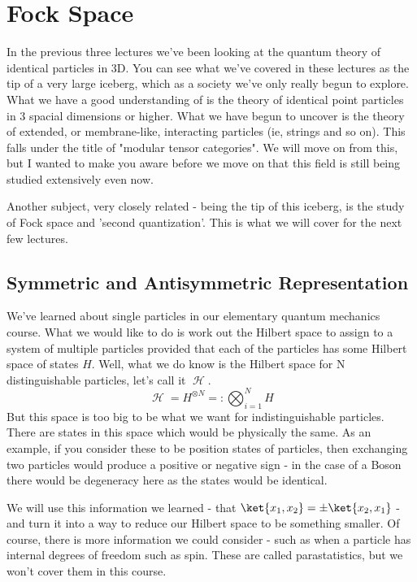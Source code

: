 \documentclass{article}
\DeclareMathOperator{\Hh}{{\mathcal{H}}}
\begin{document}
\section{Fock Space}
In the previous three lectures we've been looking at the quantum theory of identical particles in 3D. You can see what we've covered in these lectures as the tip of a very large iceberg, which as a society we've only really begun to explore. What we have a good understanding of is the theory of identical point particles in 3 spacial dimensions or higher. What we have begun to uncover is the theory of extended, or membrane-like, interacting particles (ie, strings and so on). This falls under the title of "modular tensor categories". We will move on from this, but I wanted to make you aware before we move on that this field is still being studied extensively even now.

Another subject, very closely related - being the tip of this iceberg, is the study of Fock space and 'second quantization'. This is what we will cover for the next few lectures.

\subsection{Symmetric and Antisymmetric Representation}

We've learned about single particles in our elementary quantum mechanics course. What we would like to do is work out the Hilbert space to assign to a system of multiple particles provided that each of the particles has some Hilbert space of states $H$. Well, what we do know is the Hilbert space for N distinguishable particles, let's call it $\Hh$.
\begin{equation}
\Hh = H^{\otimes N} =: \bigotimes_{i=1}^N H
\end{equation}
But this space is too big to be what we want for indistinguishable particles. There are states in this space which would be physically the same. As an example, if you consider these to be position states of particles, then exchanging two particles would produce a positive or negative sign - in the case of a Boson there would be degeneracy here as the states would be identical.

We will use this information we learned - that $\ket{x_1,x_2} = \pm \ket{x_2, x_1}$ - and turn it into a way to reduce our Hilbert space to be something smaller. Of course, there is more information we could consider - such as when a particle has internal degrees of freedom such as spin. These are called parastatistics, but we won't cover them in this course.
\end{document}
